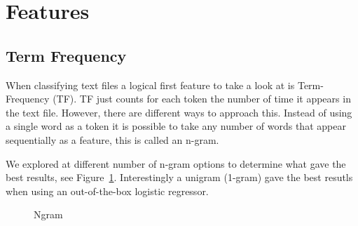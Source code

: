 \section{Features}

\subsection{Term Frequency}

When classifying text files a logical first feature to take a look at is Term-Frequency (TF).
TF just counts for each token the number of time it appears in the text file.
However, there are different ways to approach this. 
Instead of using a single word as a token it is possible to take any number of words that appear sequentially  as a feature, this is called an n-gram.

We explored at different number of n-gram options to determine what gave the best results, see Figure~\ref{fig:ngram}.
Interestingly a unigram (1-gram) gave the best resutls when using an out-of-the-box logistic regressor. 

\begin{figure}[ht!]
    \centering
    \hfill
        \hfill
  \caption{Ngram}
  \label{fig:ngram} 
\end{figure}


